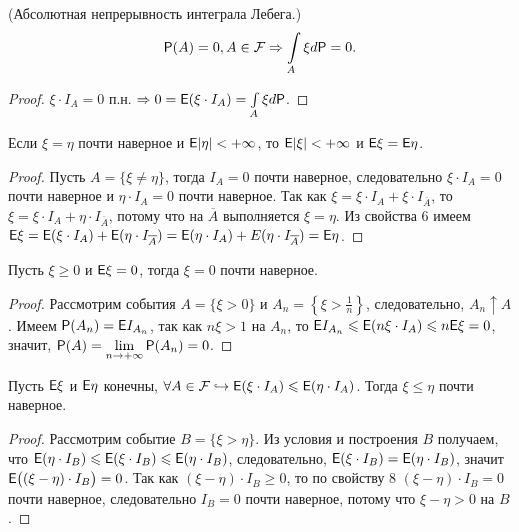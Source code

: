 \begin{consequence} (Абсолютная непрерывность интеграла Лебега.)
    $$ \P(A) = 0, A \in \F \Rightarrow \int\limits_{A} \xi d\P = 0. $$
    \begin{proof}
        $\xi \cdot I_A = 0$ п.н. $\Rightarrow 0 = \E(\xi \cdot I_A) = \int\limits_A\xi d\P$.
    \end{proof}
\end{consequence}

\begin{property}
	Если $\xi = \eta$ почти наверное и $\E | \eta| < +\infty$, то $\E | \xi| < +\infty$ и $\E \xi = \E \eta$.
	\begin{proof}
		Пусть $A = \{ \xi \neq \eta \}$, тогда $I_A = 0$ почти наверное, следовательно $\xi \cdot I_A = 0$ почти наверное и $\eta \cdot I_A = 0$ почти наверное. Так как $\xi = \xi \cdot I_A + \xi \cdot I_{\overline A}$, то $\xi = \xi \cdot I_A + \eta \cdot I_{\overline A}$, потому что на $\overline A$ выполняется $\xi = \eta$. Из свойства 6 имеем $\E \xi = \E ( \xi \cdot I_A ) + \E (\eta \cdot I_{\overline A} ) = \E ( \eta \cdot I_A) + E ( \eta \cdot I_{\overline A} ) = \E \eta$. 
	\end{proof}
\end{property}

\begin{property}
	Пусть $\xi \geqslant 0$ и $\E \xi = 0$, тогда $\xi = 0$ почти наверное.
	\begin{proof}
		Рассмотрим события $A = \{ \xi > 0 \}$ и $A_n = \left\{ \xi > \frac{1}{n} \right\} $, следовательно, $A_n \uparrow A$. Имеем $\P (A_n) = \E I_{A_n}$, так как $n\xi > 1$ на $A_n$, то  $\E I_{A_n} \leqslant \E (n\xi \cdot I_A) \leqslant n \E \xi = 0$, значит, $\P(A) = \lim\limits_{n \rightarrow +\infty} \P (A_n) = 0$.
	\end{proof}
\end{property}

\begin{property}
	Пусть $\E \xi$ и $\E \eta$ конечны, $\forall A \in \F \hookrightarrow \E (\xi \cdot I_A) \leqslant \E ( \eta \cdot I_A)$. Тогда  $\xi \leqslant \eta$ почти наверное.
	\begin{proof}
		Рассмотрим событие $B = \{ \xi > \eta \}$. Из условия и построения $B$ получаем, что $\E (\eta \cdot I_B) \leqslant \E (\xi \cdot I_B) \leqslant \E (\eta \cdot I_B)$, следовательно, $\E( \xi \cdot I_B) = \E(\eta \cdot I_B)$, значит $\E \big( (\xi - \eta) \cdot I_B \big) = 0$. Так как $(\xi - \eta) \cdot I_B \geqslant 0$, то по свойству 8 $(\xi - \eta) \cdot I_B = 0$ почти наверное, следовательно $I_B = 0$ почти наверное, потому что $\xi- \eta > 0$ на $B$.
	\end{proof}
\end{property}

